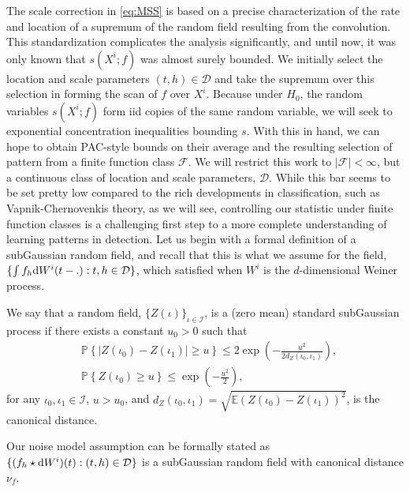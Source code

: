 The scale correction in \eqref{eq:MSS} is based on a precise characterization of the rate and location of a supremum of the random field resulting from the convolution.
This standardization complicates the analysis significantly, and until now, it was only known that $s(X^i;f)$ was almost surely bounded.
We initially select the location and scale parameters $(t,h) \in \mathcal D$ and take the supremum over this selection in forming the scan of $f$ over $X^i$.
Because under $H_0$, the random variables $s(X^i; f)$ form iid copies of the same random variable, we will seek to exponential concentration inequalities bounding $s$.
With this in hand, we can hope to obtain PAC-style bounds on their average and the resulting selection of pattern from a finite function class $\mathcal F$.
We will restrict this work to $|\mathcal F| < \infty$, but a continuous class of location and scale parameters, $\mathcal D$.
While this bar seems to be set pretty low compared to the rich developments in classification, such as Vapnik-Chernovenkis theory, as we will see, controlling our statistic under finite function classes is a challenging first step to a more complete understanding of learning patterns in detection.
Let us begin with a formal definition of a subGaussian random field, and recall that this is what we assume for the field, $\{\int f_h {\rm d} W^i(t-.) : t,h \in \mathcal D \}$, which satisfied when $W^i$ is the $d$-dimensional Weiner process. 

\begin{definition}
We say that a random field, $\{Z(\iota)\}_{\iota \in \mathcal I}$, is a (zero mean) standard subGaussian process if there exists a constant $u_0 > 0$ such that
\begin{align}
\label{eq:subGaussian1}
    &\mathbb P \left\{ |Z(\iota_0) - Z(\iota_1) | \ge u \right\} \le 2 \exp \left( - \frac{u^2}{2 d_Z(\iota_0,\iota_1)} \right),\\
\label{eq:subGaussian2}
    &\mathbb P \left\{ Z(\iota_0) \ge u \right\} \le \exp \left( - \frac{u^2}{2} \right),
\end{align}
for any $\iota_0, \iota_1 \in \mathcal I$, $u > u_0$, and $d_Z(\iota_0,\iota_1) = \sqrt{\mathbb E (Z(\iota_0) - Z(\iota_1))^2}$,    
is the canonical distance.
\end{definition}
Our noise model assumption can be formally stated as $\{(f_h \star {\rm d} W^i)(t): (t,h) \in \mathcal D \}$ is a subGaussian random field with canonical distance $\nu_f$.

